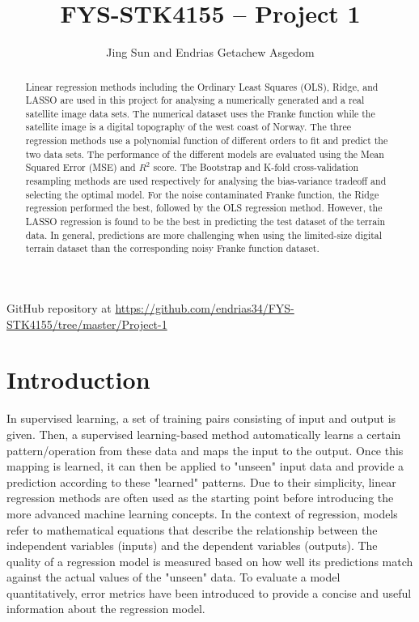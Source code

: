 \documentclass[a4paper]{article}
\begin{document}
\title{FYS-STK4155 -- Project 1}
\author{Jing Sun and Endrias Getachew Asgedom}

\maketitle
\begin{abstract}
\noindent
Linear regression methods including the Ordinary Least Squares (OLS), Ridge, and LASSO are used in this project for analysing a numerically generated and a real satellite image data sets. The numerical dataset uses the Franke function while the satellite image is a digital topography of the west coast of Norway. The three regression methods use a polynomial function of different orders to fit and predict the two data sets. The performance of the different models are evaluated using the Mean Squared Error (MSE) and $R^2$ score. The Bootstrap and K-fold cross-validation resampling methods are used respectively for analysing the bias-variance tradeoff and selecting the optimal model. For the noise contaminated Franke function, the Ridge regression performed the best, followed by the OLS regression method. However, the LASSO regression is found to be the best in predicting the test dataset of the terrain data. In general, predictions are more challenging when using the limited-size digital terrain dataset than the corresponding noisy Franke function dataset.



\end{abstract}
\newpage

\tableofcontents

\begin{center}
    GitHub repository at \url{https://github.com/endrias34/FYS-STK4155/tree/master/Project-1}
\end{center}

\newpage

\newcommand{\half}{\frac{1}{2}}
\newcommand{\dx}{{\Delta x}}
\newcommand{\bigO}{{\mathcal{O}}}


\section{Introduction}
In supervised learning, a set of training pairs consisting of input and output is given. Then, a supervised learning-based method automatically learns a certain pattern/operation from these data and maps the input to the output. Once this mapping is learned, it can then be applied to "unseen" input data and provide a prediction according to these "learned" patterns. Due to their simplicity, linear regression methods are often used as the starting point before introducing the more advanced machine learning concepts. In the context of regression, models refer to mathematical equations that describe the relationship between the independent variables (inputs) and the dependent variables (outputs). The quality of a regression model is measured based on how well its predictions match against the actual values of the "unseen" data. To evaluate a model quantitatively, error metrics have been introduced to provide a concise and useful information about the regression model. 
\end{document}
